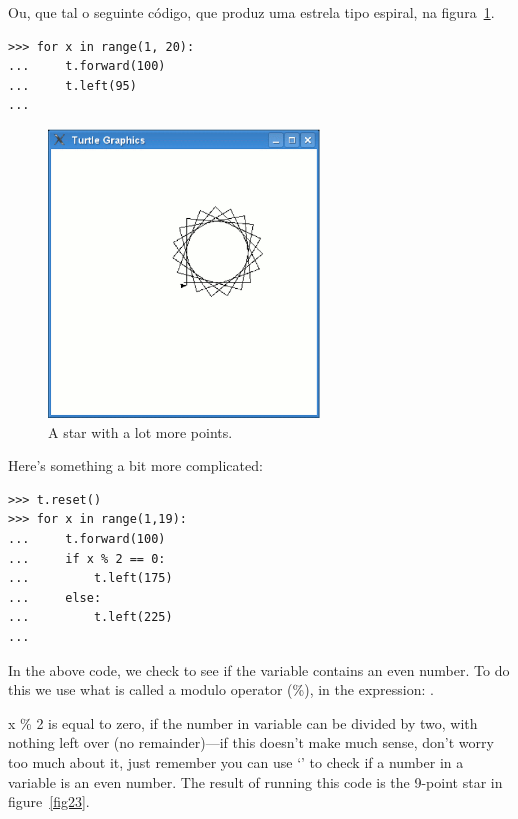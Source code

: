 \noindent
Ou, que tal o seguinte código, que produz uma estrela tipo espiral, na figura~\ref{fig22}.

\begin{listing}
\begin{verbatim}
>>> for x in range(1, 20):
...     t.forward(100)
...     t.left(95)
...
\end{verbatim}
\end{listing}

\begin{figure}
\begin{center}
\includegraphics[width=72mm]{eps/figure22.eps}
\end{center}
\caption{A star with a lot more points.}\label{fig22}
\end{figure}

\noindent
Here's something a bit more complicated:

\begin{listing}
\begin{verbatim}
>>> t.reset()
>>> for x in range(1,19):
...     t.forward(100)
...     if x % 2 == 0:
...         t.left(175)
...     else:
...         t.left(225)
...
\end{verbatim}
\end{listing}

In the above code, we check to see if the variable  contains an even number.  To do this we use what is called a modulo operator (\%), in the expression: .
\par
x \% 2 is equal to zero, if the number in variable  can be divided by two, with nothing left over (no remainder)---if this doesn't make much sense, don't worry too much about it, just remember you can use `' to check if a number in a variable is an even number.  The result of running this code is the 9-point star in figure~\ref{fig23}.

